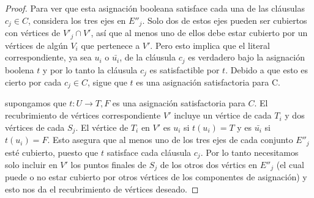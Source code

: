 \documentclass[11pt, a4paper]{memoir}
\begin{document}
\begin{proof}
Para ver que esta asignación booleana satisface cada una de las cláusulas $c_j \in C$, considera los tres ejes en $E''_j$. Solo dos de estos ejes pueden ser cubiertos con vértices de $V'_j \cap V'$, así que al menos uno de ellos debe estar cubierto por un vértices de algún $V_i$ que pertenece a $V'$. Pero esto implica que el literal correspondiente, ya sea $u_i$ o $\bar{u_i}$, de la cláusula $c_j$ es verdadero bajo la asignación boolena $t$ y por lo tanto la cláusula $c_j$ es satisfactible por $t$. Debido a que esto es cierto por cada $c_j \in C$, sigue que $t$ es una asignación satisfactoria para C.

supongamos que $t: U \rightarrow {T,F}$ es una asignación satisfactoria para $C$. El recubrimiento de vértices correspondiente $V'$ incluye un vértice de cada $T_i$ y dos vértices de cada $S_j$. El vértice de $T_i$ en $V'$ es $u_i$ si $t(u_i)=T$ y es $\bar{u_i}$ si $t(u_i)=F$. Esto asegura que al menos uno de los tres ejes de cada conjunto $E''_j$ esté cubierto, puesto que $t$ satisface cada cláusula $c_j$. Por lo tanto necesitamos solo incluir en $V'$ los puntos finales de $S_j$ de los otros dos vértics en $E''_j$ (el cual puede o no estar cubierto por otros vértices de los componentes de asignación) y esto nos da el recubrimiento de vértices deseado.
\end{proof}


\clearpage
\printglossary[type=\acronymtype]
\end{document}
